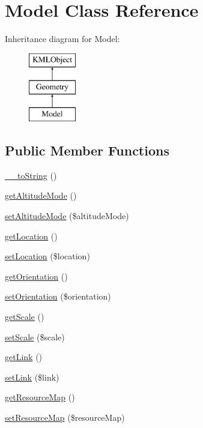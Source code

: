 \hypertarget{classModel}{
\section{Model Class Reference}
\label{d6/d18/classModel}
}
Inheritance diagram for Model:\begin{figure}[H]
\begin{center}
\leavevmode
\includegraphics[height=3.000000cm]{d6/d18/classModel}
\end{center}
\end{figure}
\subsection*{Public Member Functions}
\begin{DoxyCompactItemize}
\item 
\hyperlink{classModel_a382fdbffcf380bd37ccde3d26df12c06}{\_\-\_\-toString} ()
\item 
\hyperlink{classModel_ad35ad4d9c4fd760658e158b4295c3054}{getAltitudeMode} ()
\item 
\hyperlink{classModel_a961f5b04332b335cfe32b332483c521b}{setAltitudeMode} (\$altitudeMode)
\item 
\hyperlink{classModel_a4371356a9b8cdee3ecf83a15956cc474}{getLocation} ()
\item 
\hyperlink{classModel_a71336b408e318919be5683115fe80c58}{setLocation} (\$location)
\item 
\hyperlink{classModel_a0318a667b0dab192a0c67841604cf2ef}{getOrientation} ()
\item 
\hyperlink{classModel_a2032ed1c553cb9f7d6ea15c7357fecf4}{setOrientation} (\$orientation)
\item 
\hyperlink{classModel_a1a21b2949e4fbc2a5f6f43fbfee6a042}{getScale} ()
\item 
\hyperlink{classModel_adfa2e47afd2c5d5632c89b046d97b04d}{setScale} (\$scale)
\item 
\hyperlink{classModel_add6f064854c7948caf6e7e28ee0ee360}{getLink} ()
\item 
\hyperlink{classModel_a66506a22a17bcf588703beca360328f5}{setLink} (\$link)
\item 
\hyperlink{classModel_a1e40e689ce345b9a0383b7bc5c84de1b}{getResourceMap} ()
\item 
\hyperlink{classModel_a32958d6823d4b9e972d78ca5f3fb5fd2}{setResourceMap} (\$resourceMap)
\end{DoxyCompactItemize}


